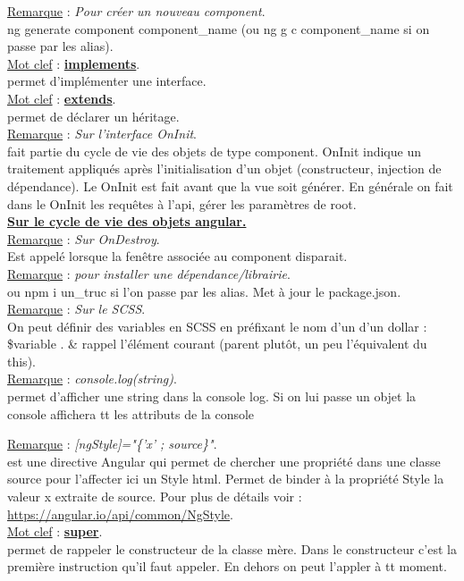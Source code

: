 \documentclass[a4paper,12pt,twoside]{article}
\newcommand{\urlcolor}{magenta}  %
\newcommand{\keycolor}{purple} %
\newcommand{\incode}[1]{{\footnotesize\ttfamily #1}} %
\newcommand{\rem}[2]{\noindent\underline{Remarque} : \textit{#1}.\\ \indent #2}
\newcommand{\keyref}[2]{\hypersetup{urlcolor=\keycolor} \href{#1}{\textbf{#2}}\hypersetup{urlcolor=\urlcolor}}
\newcommand{\keyword}[3]{\noindent\underline{Mot clef} : \keyref{#1}{#2}. \\ \indent #3}
\begin{document}
\rem{Pour créer un nouveau component}{ng generate component component\_name (ou ng g c component\_name si on passe par les alias).}\\

\keyword{}{implements}{permet d'implémenter une interface.}\\

\keyword{}{extends}{permet de déclarer un héritage.}\\

\rem{Sur l'interface OnInit}{fait partie du cycle de vie des objets de type component. OnInit indique un traitement appliqués après l'initialisation d'un objet (constructeur, injection de dépendance). Le OnInit est fait avant que la vue soit générer. En générale on fait dans le OnInit les requêtes à l'api, gérer les paramètres de root.}\\

\keyref{https://www.cuelogic.com/blog/angular-lifecycle}{Sur le cycle de vie des objets angular.}\\

\rem{Sur OnDestroy}{Est appelé lorsque la fenêtre associée au component disparait. }\\

\rem{pour installer une dépendance/librairie}{\incode{npm install un\_truc} ou \incode{npm i un\_truc} si l'on passe par les alias. Met à jour le package.json.}\\

\rem{Sur le SCSS}{On peut définir des variables en SCSS en préfixant le nom d'un d'un dollar : \$variable . \& rappel l'élément courant (parent plutôt, un peu l'équivalent du this).}\\

\rem{console.log(string)}{permet d'afficher une string dans la console log. Si on lui passe un objet la console affichera tt les attributs de la console}

\rem{[ngStyle]="\{'x' ; source\}"}{ est une directive Angular qui permet de chercher une propriété dans une classe source pour l'affecter ici un Style html. Permet de binder à la propriété Style la valeur x extraite de source. Pour plus de détails voir : \url{https://angular.io/api/common/NgStyle}.}\\

\keyword{}{super}{permet de rappeler le constructeur de la classe mère. Dans le constructeur c'est la première instruction qu'il faut appeler. En dehors on peut l'appler à tt moment.}\\
\end{document}
